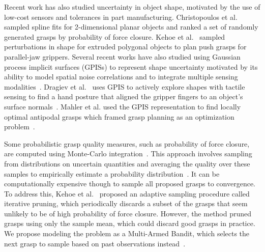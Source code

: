 \documentclass[10pt, conference]{ieeeconf}      %
\begin{document}
Recent work has also studied uncertainty in object shape, motivated by the use of low-cost sensors and tolerances in part manufacturing.
Christopoulos et al.~\cite{christopoulos2007handling} sampled spline fits for 2-dimensional planar objects and ranked a set of randomly generated grasps by probability of force closure.
Kehoe et al.~\cite{kehoe2012estimating, kehoe2012toward} sampled perturbations in shape for extruded polygonal objects to plan push grasps for parallel-jaw grippers.
Several recent works have also studied using Gaussian process implicit surfaces (GPISs) to represent shape uncertainty motivated by its ability to model spatial noise correlations and to integrate multiple sensing modalities~\cite{dragiev2011, dragiev2013uncertainty, hollinger2013, mahler2015gp}.
Dragiev et al.~\cite{dragiev2011} uses GPIS to actively explore shapes with tactile sensing to find a hand posture that aligned the gripper fingers to an object's surface normals~\cite{dragiev2013uncertainty}.
Mahler et al. used the GPIS representation to find locally optimal antipodal grasps which framed grasp planning as an optimization problem~\cite{mahler2015gp}. 






Some probabilistic grasp quality measures, such as probability of force closure, are computed using Monte-Carlo integration~\cite{christopoulos2007handling, kehoe2012toward, kim2012physically, weisz2012pose}.
This approach involves sampling from distributions on uncertain quantities and averaging the quality over these samples to empirically estimate a probability distribution~\cite{caflisch1998monte}.
It can be computationally expensive though to sample all proposed grasps to convergence.
To address this, Kehoe et al.~\cite{kehoe2012estimating} proposed an adaptive sampling procedure called iterative pruning, which periodically discards a subset of the grasps that seem unlikely to be of high probability of force closure. However, the method pruned grasps using only the sample mean, which could discard good grasps in practice.
We propose modeling the problem as a Multi-Armed Bandit, which selects the next grasp to sample based on past observations instead~\cite{barto1998reinforcement, lai1985asymptotically}.
\end{document}
